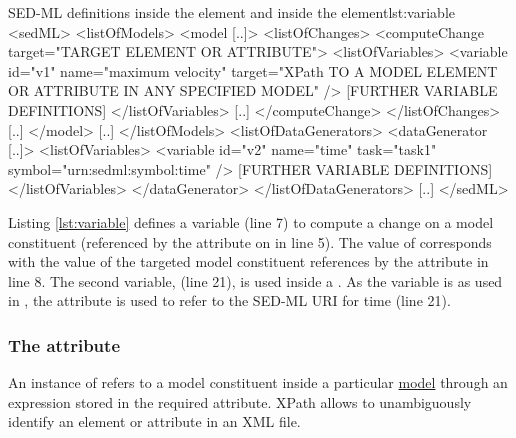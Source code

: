 %
%
\begin{myXmlLst}{SED-ML  definitions inside the  element and inside the  element}{lst:variable}
<sedML>
 <listOfModels>
  <model [..]>
   <listOfChanges>
    <computeChange target="TARGET ELEMENT OR ATTRIBUTE">
     <listOfVariables>
       <variable id="v1" name="maximum velocity" 
        target="XPath TO A MODEL ELEMENT OR ATTRIBUTE IN ANY SPECIFIED MODEL" />
      [FURTHER VARIABLE DEFINITIONS]
     </listOfVariables>
     [..]
    </computeChange>
   </listOfChanges>
   [..]
  </model>
  [..]
 </listOfModels>
 <listOfDataGenerators>
  <dataGenerator [..]>
   <listOfVariables>
    <variable id="v2" name="time" task="task1" symbol="urn:sedml:symbol:time" />
      [FURTHER VARIABLE DEFINITIONS]
   </listOfVariables>
  </dataGenerator>
 </listOfDataGenerators>
 [..]
</sedML>
\end{myXmlLst}
%
Listing \ref{lst:variable} defines a variable  (line 7) to compute a change on a model constituent (referenced by the  attribute on  in line 5). The value of  corresponds with the value of the targeted model constituent references by the  attribute in line 8. 
The second variable,  (line 21), is used inside a . As the variable is  as used in  , the  attribute is used to refer to the SED-ML URI for time (line 21).

\subsubsection{The  attribute}
\label{sec:target}
An instance of  refers to a model constituent inside a particular \hyperref[class:model]{model} through an  expression stored in the required  attribute. 
%
XPath allows to unambiguously identify an element or attribute in an XML file.

